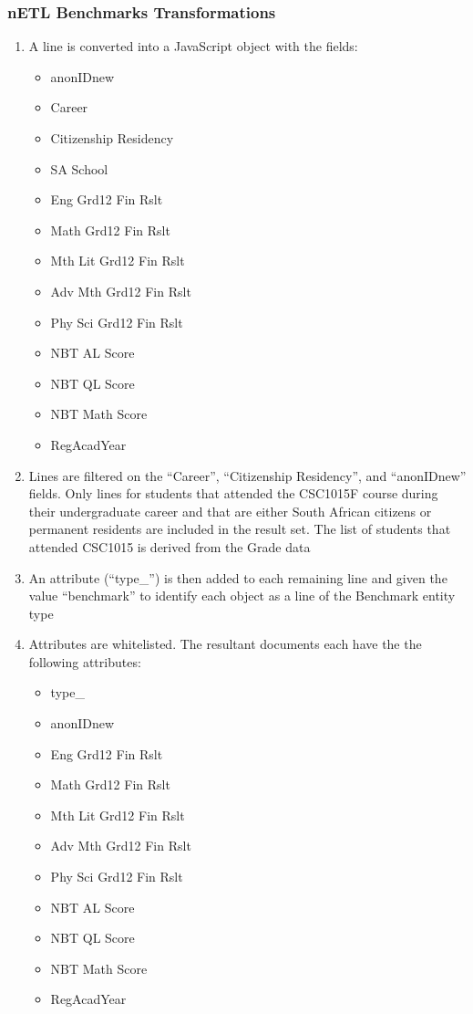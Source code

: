 \subsubsection{nETL Benchmarks Transformations}
\begin{enumerate}
  \item A line is converted into a JavaScript object with the fields:
        \begin{itemize}
          \item anonIDnew
          \item Career
          \item Citizenship Residency
          \item SA School
          \item Eng Grd12 Fin Rslt
          \item Math Grd12 Fin Rslt
          \item Mth Lit Grd12 Fin Rslt
          \item Adv Mth Grd12 Fin Rslt
          \item Phy Sci Grd12 Fin Rslt
          \item NBT AL Score
          \item NBT QL Score
          \item NBT Math Score
          \item RegAcadYear
        \end{itemize}
  \item Lines are filtered on the ``Career'', ``Citizenship Residency'', and ``anonIDnew'' fields. Only lines for students that attended the CSC1015F course during their undergraduate career and that are either South African citizens or permanent residents are included in the result set. The list of students that attended CSC1015 is derived from the Grade data
  \item An attribute (``type\_'') is then added to each remaining line and given the value ``benchmark'' to identify each object as a line of the Benchmark entity type
  \item Attributes are whitelisted. The resultant documents each have the the following attributes:
        \begin{itemize}
          \item type\_
          \item anonIDnew
          \item Eng Grd12 Fin Rslt
          \item Math Grd12 Fin Rslt
          \item Mth Lit Grd12 Fin Rslt
          \item Adv Mth Grd12 Fin Rslt
          \item Phy Sci Grd12 Fin Rslt
          \item NBT AL Score
          \item NBT QL Score
          \item NBT Math Score
          \item RegAcadYear
        \end{itemize}
\end{enumerate}

